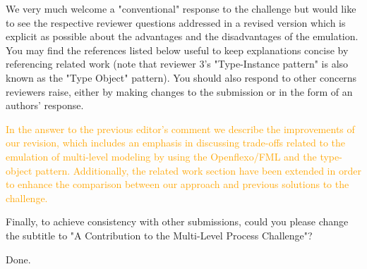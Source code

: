 \documentclass[10pt]{article}
\begin{document}
\begin{response}{We very much welcome a "conventional" response to the challenge but would like to see the respective reviewer questions addressed in a revised version which is explicit as possible about the advantages and the disadvantages of the emulation. You may find the references listed below useful to keep explanations concise by referencing related work (note that reviewer 3's "Type-Instance pattern" is also known as the "Type Object" pattern). You should also respond to other concerns reviewers raise, either by making changes to the submission or in the form of an authors' response.}

\textcolor{orange}{In the answer to the previous editor's comment we describe the improvements of our revision, which includes an emphasis in discussing trade-offs related to the emulation of multi-level modeling by using the Openflexo/FML and the type-object pattern. Additionally, the related work section have been extended in order to enhance the comparison between our approach and previous solutions to the challenge.}

\end{response}


\begin{response}{Finally, to achieve consistency with other submissions, could you please change the subtitle to "A Contribution to the Multi-Level Process Challenge"?}

Done.
\end{response}

\pagebreak
\end{document}
